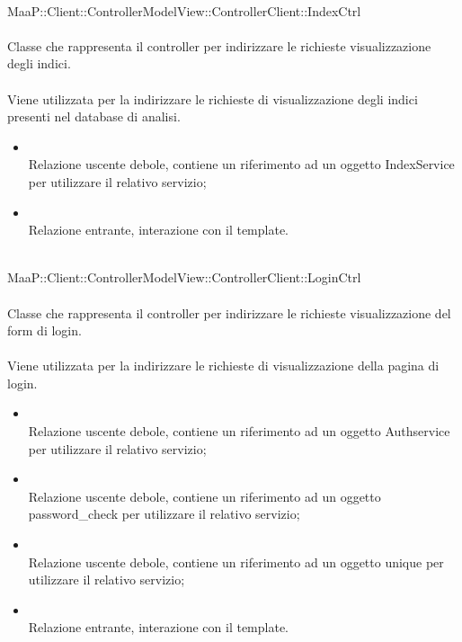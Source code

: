 \\
MaaP::Client::ControllerModelView::ControllerClient::IndexCtrl\\
\\
Classe che rappresenta il controller per indirizzare le richieste visualizzazione degli indici.\\
\\
Viene utilizzata per la indirizzare le richieste di visualizzazione degli indici presenti nel database di analisi.\\
\begin{itemize}
\item{}\\
Relazione uscente debole, contiene un riferimento ad un oggetto IndexService per utilizzare il relativo servizio;
\item{}\\
Relazione entrante, interazione con il template.
\end{itemize}

\\
MaaP::Client::ControllerModelView::ControllerClient::LoginCtrl\\
\\
Classe che rappresenta il controller per indirizzare le richieste visualizzazione del form di login.\\
\\
Viene utilizzata per la indirizzare le richieste di visualizzazione della pagina di login.\\
\begin{itemize}
\item{}\\
Relazione uscente debole, contiene un riferimento ad un oggetto Authservice per utilizzare il relativo servizio;
\item{}\\
Relazione uscente debole, contiene un riferimento ad un oggetto password\_check per utilizzare il relativo servizio;
\item{}\\
Relazione uscente debole, contiene un riferimento ad un oggetto unique per utilizzare il relativo servizio;
\item{}\\
Relazione entrante, interazione con il template.
\end{itemize}


